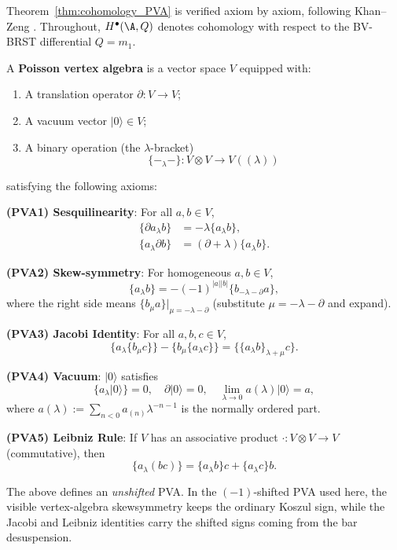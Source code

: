 Theorem~\ref{thm:cohomology_PVA} is verified axiom by axiom, following Khan--Zeng \cite{KZ25}. Throughout, $H^\bullet(\A, Q)$ denotes cohomology with respect to the BV-BRST differential $Q = m_1$.

\begin{definition}
A \textbf{Poisson vertex algebra} is a vector space $V$ equipped with:
\begin{enumerate}[label=(\roman*)]
\item A translation operator $\partial : V \to V$;
\item A vacuum vector $|0\rangle \in V$;
\item A binary operation (the $\lambda$-bracket)
\[
\{-_\lambda -\} : V \otimes V \longrightarrow V((\lambda))
\]
\end{enumerate}
satisfying the following axioms:

\textbf{(PVA1) Sesquilinearity}: For all $a, b \in V$,
\begin{align}
\{\partial a_\lambda b\} &= -\lambda \{a_\lambda b\},\\
\{a_\lambda \partial b\} &= (\partial + \lambda) \{a_\lambda b\}.
\end{align}

\textbf{(PVA2) Skew-symmetry}: For homogeneous $a, b \in V$,
\[
\{a_\lambda b\} = -(-1)^{|a||b|}\{b_{-\lambda - \partial} a\}, %
\]
where the right side means $\{b_\mu a\}|_{\mu = -\lambda - \partial}$ (substitute $\mu = -\lambda - \partial$ and expand).

\textbf{(PVA3) Jacobi Identity}: For all $a, b, c \in V$,
\[
\{ a_\lambda \{b_\mu c\} \} - \{ b_\mu \{a_\lambda c\} \} = \{ \{a_\lambda b\}_{\lambda + \mu} c \}. %
\]

\textbf{(PVA4) Vacuum}: $|0\rangle$ satisfies
\[
\{a_\lambda |0\rangle\} = 0, \quad \partial |0\rangle = 0, \quad \lim_{\lambda \to 0} a(\lambda) |0\rangle = a,
\]
where $a(\lambda) := \sum_{n < 0} a_{(n)} \lambda^{-n-1}$ is the normally ordered part.

\textbf{(PVA5) Leibniz Rule}: If $V$ has an associative product $\cdot : V \otimes V \to V$ (commutative), then
\[
\{a_\lambda (bc)\} = \{a_\lambda b\} c + \{a_\lambda c\} b. %
\]
\end{definition}

\begin{remark}
The above defines an \emph{unshifted} PVA. In the $(-1)$-shifted
PVA used here, the visible vertex-algebra skewsymmetry keeps the
ordinary Koszul sign, while the Jacobi and Leibniz identities carry
the shifted signs coming from the bar desuspension.
\end{remark}

